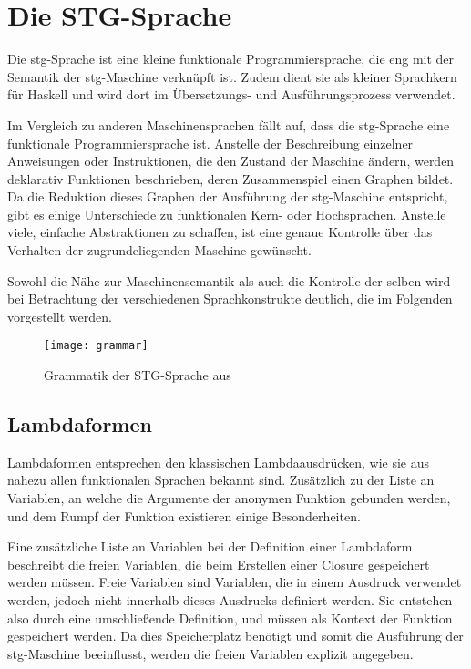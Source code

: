 
\chapter{Die STG-Sprache}\label{chap:stg}

Die \gls{stg}-Sprache ist eine kleine funktionale Programmiersprache, die eng mit der Semantik der \gls{stg}-Maschine verknüpft ist.
Zudem dient sie als kleiner Sprachkern für Haskell und wird dort im Übersetzungs- und Ausführungsprozess verwendet.

Im Vergleich zu anderen Maschinensprachen fällt auf, dass die \gls{stg}-Sprache eine funktionale Programmiersprache ist.
Anstelle der Beschreibung einzelner Anweisungen oder Instruktionen, die den Zustand der Maschine ändern, werden deklarativ Funktionen beschrieben, deren Zusammenspiel einen Graphen bildet.
Da die Reduktion dieses Graphen der Ausführung der \gls{stg}-Maschine entspricht, gibt es einige Unterschiede zu funktionalen Kern- oder Hochsprachen.
Anstelle viele, einfache Abstraktionen zu schaffen, ist eine genaue Kontrolle über das Verhalten der zugrundeliegenden Maschine gewünscht.

Sowohl die Nähe zur Maschinensemantik als auch die Kontrolle der selben wird bei Betrachtung der verschiedenen Sprachkonstrukte deutlich, die im Folgenden vorgestellt werden.

\begin{figure}
  \centering
  \texttt{[image: grammar]}
  \caption[Grammatik der STG-Sprache]{Grammatik der STG-Sprache aus \cite{Jones_StockHardwareSTG}}\label{fig:grammar}
\end{figure}

\section{Lambdaformen}

Lambdaformen entsprechen den klassischen Lambdaausdrücken, wie sie aus nahezu allen funktionalen Sprachen bekannt sind.
Zusätzlich zu der Liste an Variablen, an welche die Argumente der anonymen Funktion gebunden werden, und dem Rumpf der Funktion existieren einige Besonderheiten.

Eine zusätzliche Liste an Variablen bei der Definition einer Lambdaform beschreibt die freien Variablen, die beim Erstellen einer Closure gespeichert werden müssen.
Freie Variablen sind Variablen, die in einem Ausdruck verwendet werden, jedoch nicht innerhalb dieses Ausdrucks definiert werden.
Sie entstehen also durch eine umschließende Definition, und müssen als Kontext der Funktion gespeichert werden.
Da dies Speicherplatz benötigt und somit die Ausführung der \gls{stg}-Maschine beeinflusst, werden die freien Variablen explizit angegeben.

